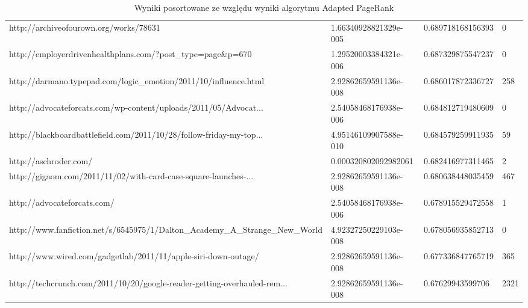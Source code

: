 \begin{sidewaystable}[h]
\begin{tabular}{ | p{14cm} | l | l | l| }
 http://archiveofourown.org/works/78631                                                                                                         & 1.66340928821329e-005 & 0.689718168156393 &     0 \\
 http://employerdrivenhealthplans.com/?post\_type=page\&p=670                                                                                     & 1.29520003384321e-006 & 0.687329875547237 &     0 \\
 http://darmano.typepad.com/logic\_emotion/2011/10/influence.html                                                                                & 2.92862659591136e-008 & 0.686017872336727 &   258 \\
 http://advocateforcats.com/wp-content/uploads/2011/05/Advocat...                                                           & 2.54058468176938e-006 & 0.684812719480609 &     0 \\
 http://blackboardbattlefield.com/2011/10/28/follow-friday-my-top... & 4.95146109907588e-010 & 0.684579259911935 &    59 \\
 http://aschroder.com/                                                                                                                          &  0.000320802092982061 & 0.682416977311465 &     2 \\
 http://gigaom.com/2011/11/02/with-card-case-square-launches-... & 2.92862659591136e-008 & 0.680638448035459 &   467 \\
 http://advocateforcats.com/                                                                                                                    & 2.54058468176938e-006 & 0.678915529472558 &     1 \\
 http://www.fanfiction.net/s/6545975/1/Dalton\_Academy\_A\_Strange\_New\_World                                                                       & 4.92327250229103e-008 & 0.678056935852713 &     0 \\
 http://www.wired.com/gadgetlab/2011/11/apple-siri-down-outage/                                                                                 & 2.92862659591136e-008 & 0.677336847765719 &   365 \\
 http://techcrunch.com/2011/10/20/google-reader-getting-overhauled-rem...                                                       & 2.92862659591136e-008 &  0.67629943599706 &  2321 \\




\hline
\end{tabular}
  \caption{Wyniki posortowane ze względu wyniki algorytmu Adapted PageRank }
  \label{tab:adapted_wyniki_sorted}
\end{sidewaystable}




